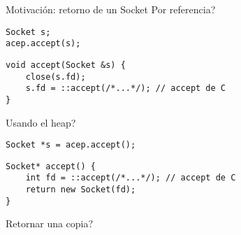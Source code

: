 \begin{frame}[fragile]{Motivaci\'on: retorno de un Socket}{}
Por referencia? 
        \begin{lstlisting}[style=normal,firstnumber=1]
Socket s;
acep.accept(s);
        \end{lstlisting}

        \begin{lstlisting}[style=normal,firstnumber=10]
void accept(Socket &s) {
    close(s.fd);
    s.fd = ::accept(/*...*/); // accept de C
}
        \end{lstlisting}

        \pause
        \pause
Usando el heap? 
        \begin{lstlisting}[style=normal,firstnumber=1]
Socket *s = acep.accept();
        \end{lstlisting}
        \begin{lstlisting}[style=normal,firstnumber=10]
Socket* accept() {
    int fd = ::accept(/*...*/); // accept de C
    return new Socket(fd);
}
        \end{lstlisting}
        \pause
        \pause
Retornar una copia? 

\end{frame}

